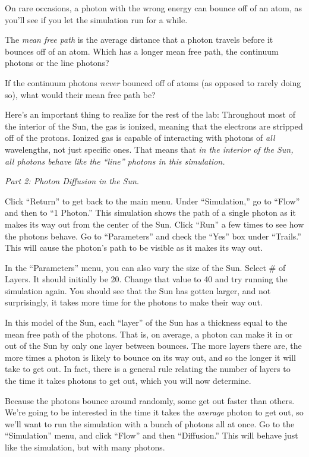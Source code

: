 On rare occasions, a photon
with the wrong energy can bounce off of an atom, as you'll see if you 
let the simulation run for a while.

The {\it mean free path} is the average distance that a photon travels
before it bounces off of an atom.  Which has a longer mean free path,
the continuum photons or the line photons?

\answerspace{1in}

If the continuum photons {\it never} bounced off of atoms (as opposed
to rarely doing so), what would their mean free path be?

\answerspace{1in}

Here's an important thing to realize for the rest of the lab:
Throughout most of the interior of the Sun, the gas is ionized,
meaning that the electrons are stripped off of the protons.  Ionized
gas is capable of interacting with photons of {\it all} wavelengths,
not just specific ones.  That means that {\it in the interior of the
Sun, all photons behave like the ``line'' photons in this simulation.}

{\it Part 2: Photon Diffusion in the Sun}.

Click ``Return'' to get back to the main menu.  Under ``Simulation,'' 
go to ``Flow'' and then to ``1 Photon.''  
This simulation shows the path of a single photon as it makes its
way out from the center of the Sun.  Click ``Run'' a few times to 
see how the photons behave.  Go to ``Parameters'' and check the ``Yes''
box under ``Trails.''  This will cause the photon's path to be
visible as it makes its way out.

In the ``Parameters'' menu, you can also vary the size of the Sun.
Select \# of Layers.  It should initially be 20.  Change that value to 40
and try running the simulation again.  You should see that the Sun
has gotten larger, and not surprisingly, it takes more time for the photons
to make their way out.

In this model of the Sun, each ``layer'' of the Sun has a thickness
equal to the mean free path of the photons.  That is, on average,
a photon can make it in or out of the Sun by only one layer between
bounces.  The more layers there are, the more times a photon is likely
to bounce on its way out, and so the longer it will take to get out.
In fact, there is a general rule relating the number of layers to the
time it takes photons to get out, which you will now determine.

Because the photons bounce around randomly, some get out faster than others.
We're going to be interested in the time it takes the \textit{average}
photon to get out, so we'll want to run the simulation with a bunch of photons
all at once. Go to the ``Simulation'' menu, and click ``Flow'' and then
``Diffusion.'' This will behave just like the simulation, but with many photons.


